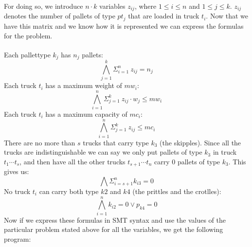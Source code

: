 \documentclass[12pt]{article}
\begin{document}
For doing so, we introduce $n \cdot k$ variables $z_{ij}$, where $1 \leq i \leq n$ and $1 \leq j \leq k$. $z_{ij}$ denotes the number of pallets of type $pt_j$ that are loaded in truck $t_i$. Now that we have this matrix and we know how it is represented we can express the formulas for the problem.
\\
\\
Each pallettype $k_j$ has $n_j$ pallets:
\[\bigwedge_{j=1}^{k} \Sigma_{i=1}^{n} \ z_{ij} = n_j\]
Each truck $t_i$ has a maximum weight of $mw_i$:
\[\bigwedge_{i=1}^{n} \Sigma_{j=1}^{k} \ z_{ij} \cdot w_j \leq mw_i\]
Each truck $t_i$ has a maximum capacity of $mc_i$:
\[\bigwedge_{i=1}^{n} \Sigma_{j=1}^{k} \ z_{ij}\leq mc_i\]
There are no more than $s$ trucks that carry type $k_3$ (the skipples). Since all the trucks are indistinguishable we can say we only put pallets of type $k_3$ in truck $t_1 \cdots t_s$, and then have all the other trucks $t_{s+1} \cdots t_n$ carry 0 pallets of type $k_3$. This gives us:
\[\bigwedge \Sigma_{i=s + 1}^{n} k_{i3} = 0\]
No truck $t_i$ can carry both type $k2$ and $k4$ (the prittles and the crotlles):
\[\bigwedge_{i=1}^{n} k_{i2} = 0 \vee p_{k4} = 0 \]
Now if we express these formulas in SMT syntax and use the values of the particular problem stated above for all the variables, we get the following program:
\end{document}

